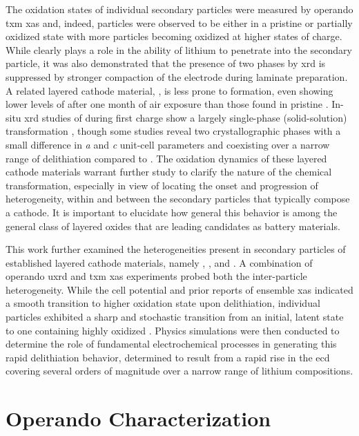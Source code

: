 \documentclass{article}
\begin{document}
The oxidation states of individual secondary particles were measured
by operando \gls{txm} \gls{xas} and, indeed, particles were observed
to be either in a pristine or partially oxidized state with more
particles becoming oxidized at higher states of
charge\cite{nowack2016}. While  clearly plays a role in the
ability of lithium to penetrate into the secondary particle, it was
also demonstrated that the presence of two phases by \gls{xrd} is
suppressed by stronger compaction of the electrode during laminate
preparation\cite{bobrikov2018}. A related layered cathode material,
\nmc[333]{}, is less prone to  formation, even showing
lower levels of  after one month of air exposure than those
found in pristine \nca{}\cite{shizuka2007}. In-situ \gls{xrd} studies
of \nmc[333]{} during first charge show a largely single-phase
(solid-solution) transformation \cite{hulzen2018,ahn2017,zhou2016-2},
though some studies reveal two crystallographic phases with a small
difference in \emph{a} and \emph{c} unit-cell parameters and
coexisting over a narrow range of delithiation compared to
\nca{}\cite{yoon2006,hua2018}. The oxidation dynamics of these layered
cathode materials warrant further study to clarify the nature of the
chemical transformation, especially in view of locating the onset and
progression of heterogeneity, within and between the secondary
particles that typically compose a cathode. It is important to
elucidate how general this behavior is among the general class of
layered oxides that are leading candidates as battery materials.

This work further examined the heterogeneities present in secondary
particles of established layered cathode materials, namely \nca{},
\nmc[333]{}, and \nmc[532]{}. A combination of operando \gls{uxrd} and
\gls{txm} \gls{xas} experiments probed both the inter-particle
heterogeneity. While the cell potential and prior reports of ensemble
\gls{xas} indicated a smooth transition to higher oxidation state upon
delithiation\cite{deb2005,muto2009}, individual particles exhibited a
sharp and stochastic transition from an initial, latent state to one
containing highly oxidized . Physics simulations were then
conducted to determine the role of fundamental electrochemical
processes in generating this rapid delithiation behavior, determined
to result from a rapid rise in the \gls{ecd} covering several orders
of magnitude over a narrow range of lithium compositions.

\section{Operando Characterization}
\end{document}
